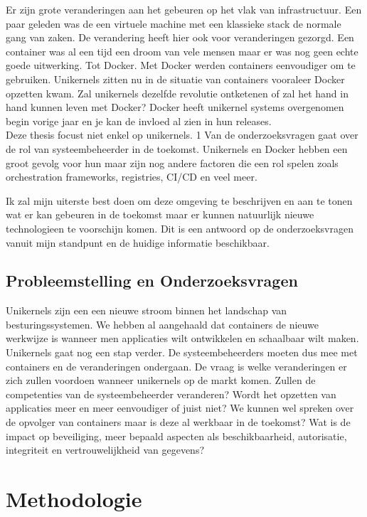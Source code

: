 \documentclass[pdftex,a4paper,12pt,twoside]{report}
\begin{document}
Er zijn grote veranderingen aan het gebeuren op het vlak van infrastructuur. Een paar geleden was de een virtuele machine met een klassieke stack de normale gang van zaken. De verandering heeft hier ook voor veranderingen gezorgd. Een container was al een tijd een droom van vele mensen maar er was nog geen echte goede uitwerking. Tot Docker. Met Docker werden containers eenvoudiger om te gebruiken. Unikernels zitten nu in de situatie van containers vooraleer Docker opzetten kwam. Zal unikernels dezelfde revolutie ontketenen of zal het hand in hand kunnen leven met Docker? Docker heeft unikernel systems overgenomen begin vorige jaar en je kan de invloed al zien in hun releases. \\

Deze thesis focust niet enkel op unikernels. 1 Van de onderzoeksvragen gaat over de rol van systeembeheerder in de toekomst. Unikernels en Docker hebben een groot gevolg voor hun maar zijn nog andere factoren die een rol spelen zoals orchestration frameworks, registries, CI/CD en veel meer.

Ik zal mijn uiterste best doen om deze omgeving te beschrijven en aan te tonen wat er kan gebeuren in de toekomst maar er kunnen natuurlijk nieuwe technologieen te voorschijn komen. Dit is een antwoord op de onderzoeksvragen vanuit mijn standpunt en de huidige informatie beschikbaar.

\section{Probleemstelling en Onderzoeksvragen}
\label{sec:onderzoeksvragen}

Unikernels zijn een een nieuwe stroom binnen het landschap van besturingssystemen. We hebben al aangehaald dat containers de nieuwe werkwijze is wanneer men applicaties wilt ontwikkelen en schaalbaar wilt maken. Unikernels gaat nog een stap verder. De systeembeheerders moeten dus mee met containers en de veranderingen ondergaan. De vraag is welke veranderingen er zich zullen voordoen wanneer unikernels op de markt komen. Zullen de competenties van de systeembeheerder veranderen? Wordt het opzetten van applicaties meer en meer eenvoudiger of juist niet? We kunnen wel spreken over de opvolger van containers maar is deze al werkbaar in de toekomst? Wat is de impact op beveiliging, meer bepaald aspecten als beschikbaarheid, autorisatie, integriteit en vertrouwelijkheid van gegevens?


\chapter{Methodologie}
\label{ch:methodologie}
\end{document}
